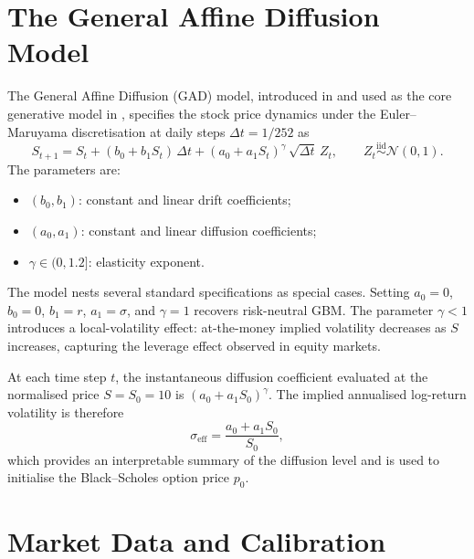 \section{The General Affine Diffusion Model}%
\label{sec:gad_model}

The General Affine Diffusion (GAD) model, introduced in
\citet{lutkebohmert2022robust} and used as the core generative model in
\citet{he2025}, specifies the stock price dynamics under the Euler--Maruyama
discretisation at daily steps $\Delta t = 1/252$ as
\begin{equation}
  S_{t+1} = S_t
            + (b_0 + b_1 S_t)\,\Delta t
            + (a_0 + a_1 S_t)^{\gamma}\,\sqrt{\Delta t}\,Z_t,
  \qquad Z_t \overset{\mathrm{iid}}{\sim} \mathcal{N}(0,1).
  \label{eq:gad_sde}
\end{equation}
The parameters are:
\begin{itemize}
  \item $(b_0, b_1)$: constant and linear drift coefficients;
  \item $(a_0, a_1)$: constant and linear diffusion coefficients;
  \item $\gamma \in (0, 1.2]$: elasticity exponent.
\end{itemize}
The model nests several standard specifications as special cases.  Setting
$a_0 = 0$, $b_0 = 0$, $b_1 = r$, $a_1 = \sigma$, and $\gamma = 1$ recovers
risk-neutral GBM.  The parameter $\gamma < 1$ introduces a local-volatility
effect: at-the-money implied volatility decreases as $S$ increases, capturing
the leverage effect observed in equity markets.

At each time step $t$, the instantaneous diffusion coefficient evaluated at the
normalised price $S = S_0 = 10$ is $(a_0 + a_1 S_0)^\gamma$.  The implied
annualised log-return volatility is therefore
\begin{equation}
  \sigma_{\mathrm{eff}} = \frac{a_0 + a_1 S_0}{S_0},
  \label{eq:sigma_eff}
\end{equation}
which provides an interpretable summary of the diffusion level and is used to
initialise the Black--Scholes option price $p_0$.

\section{Market Data and Calibration}%
\label{sec:gad_data}

